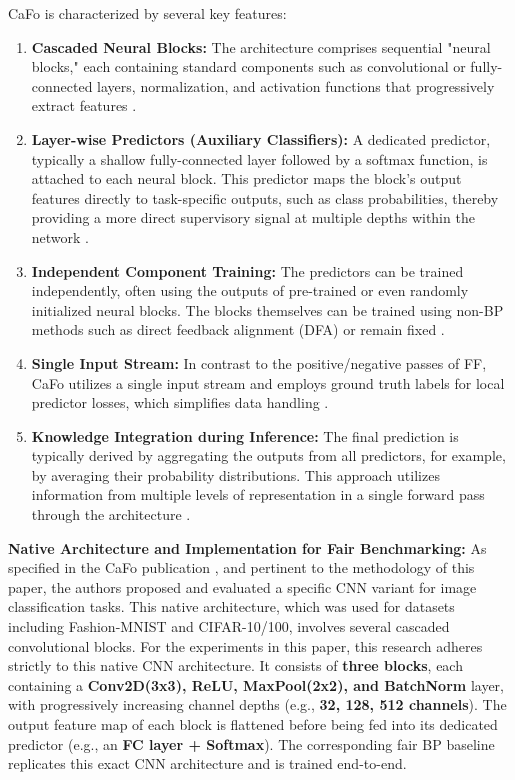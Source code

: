 CaFo is characterized by several key features:
\begin{enumerate}
    \item \textbf{Cascaded Neural Blocks:} The architecture comprises sequential "neural blocks," each containing standard components such as convolutional or fully-connected layers, normalization, and activation functions that progressively extract features \cite{zhao2023cafo}.
    \item \textbf{Layer-wise Predictors (Auxiliary Classifiers):} A dedicated predictor, typically a shallow fully-connected layer followed by a softmax function, is attached to each neural block. This predictor maps the block's output features directly to task-specific outputs, such as class probabilities, thereby providing a more direct supervisory signal at multiple depths within the network \cite{zhao2023cafo}.
    \item \textbf{Independent Component Training:} The predictors can be trained independently, often using the outputs of pre-trained or even randomly initialized neural blocks. The blocks themselves can be trained using non-BP methods such as direct feedback alignment (DFA) \cite{nokland2016direct} or remain fixed \cite{zhao2023cafo}.
    \item \textbf{Single Input Stream:} In contrast to the positive/negative passes of FF, CaFo utilizes a single input stream and employs ground truth labels for local predictor losses, which simplifies data handling \cite{zhao2023cafo}.
    \item \textbf{Knowledge Integration during Inference:} The final prediction is typically derived by aggregating the outputs from all predictors, for example, by averaging their probability distributions. This approach utilizes information from multiple levels of representation in a single forward pass through the architecture \cite{zhao2023cafo}.
\end{enumerate}

\textbf{Native Architecture and Implementation for Fair Benchmarking:}
As specified in the CaFo publication \cite{zhao2023cafo}, and pertinent to the methodology of this paper, the authors proposed and evaluated a specific CNN variant for image classification tasks. This native architecture, which was used for datasets including Fashion-MNIST and CIFAR-10/100, involves several cascaded convolutional blocks. For the experiments in this paper, this research adheres strictly to this native CNN architecture. It consists of \textbf{three blocks}, each containing a \textbf{Conv2D(3x3), ReLU, MaxPool(2x2), and BatchNorm} layer, with progressively increasing channel depths (e.g., \textbf{32, 128, 512 channels}). The output feature map of each block is flattened before being fed into its dedicated predictor (e.g., an \textbf{FC layer + Softmax}). The corresponding fair BP baseline replicates this exact CNN architecture and is trained end-to-end.

